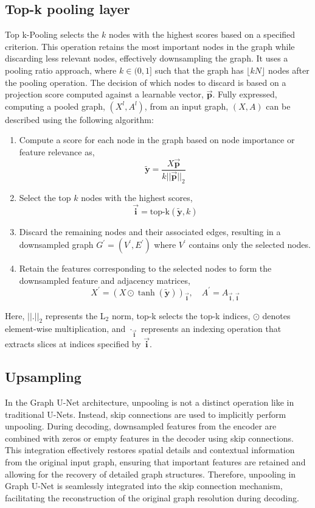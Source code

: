 \subsection{Top-k pooling layer}
Top k-Pooling selects the $k$ nodes with the highest scores based on a specified criterion. This operation retains the most important nodes in the graph while discarding less relevant nodes, effectively downsampling the graph. It uses a pooling ratio approach, where $k \in (0, 1]$ such that the graph has $\lfloor kN \rfloor$ nodes after the pooling operation. The decision of which nodes to discard is based on a projection score computed against a learnable vector, $\mathbf{\overrightarrow{p}}$. Fully expressed, computing a pooled graph, $(X^l, A^l)$, from an input graph, $(X, A)$ can be described using the following algorithm: 
\begin{enumerate}
    \item Compute a score for each node in the graph based on node importance or feature relevance as,
    \[
\mathbf{\tilde{y}} = \frac{X \mathbf{\overrightarrow{p}}}{k||\mathbf{\overrightarrow{p}}||_2} \]
    \item Select the top $k$ nodes with the highest scores, \[ \mathbf{\overrightarrow{i}} = \text{top-k}(\mathbf{\tilde{y}}, k) \]
    \item Discard the remaining nodes and their associated edges, resulting in a downsampled graph $G^{\prime} = (V^{\prime}, E^{\prime})$ where $V^{\prime}$ contains only the selected nodes.
    \item Retain the features corresponding to the selected nodes to form the downsampled feature and adjacency matrices, \[
        X^{\prime} = (X \odot \tanh(\mathbf{\tilde{y}}))_{\mathbf{\overrightarrow{i}}}, \quad A^{\prime} = A_{\mathbf{\overrightarrow{i}},\mathbf{\overrightarrow{i}}}
       \]
\end{enumerate}
Here, $||.||_2$ represents the L$_2$ norm, top-k selects the top-k indices, $\odot$ denotes element-wise multiplication, and $\cdot_{\mathbf{\overrightarrow{i}}}$ represents an indexing operation that extracts slices at indices specified by $\mathbf{\overrightarrow{i}}$. 
\subsection{Upsampling}
In the Graph U-Net architecture, unpooling is not a distinct operation like in traditional U-Nets. Instead, skip connections are used to implicitly perform unpooling. During decoding, downsampled features from the encoder are combined with zeros or empty features in the decoder using skip connections. This integration effectively restores spatial details and contextual information from the original input graph, ensuring that important features are retained and allowing for the recovery of detailed graph structures. Therefore, unpooling in Graph U-Net is seamlessly integrated into the skip connection mechanism, facilitating the reconstruction of the original graph resolution during decoding.
